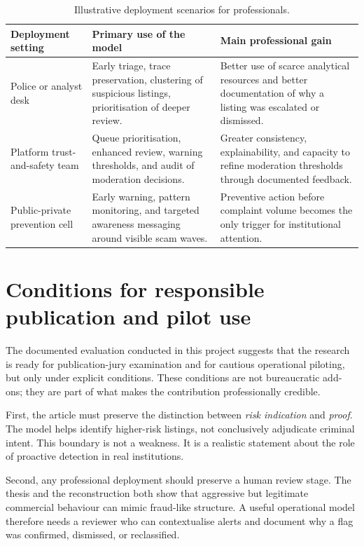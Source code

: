 \documentclass[11pt,a4paper]{article}
\begin{document}
\begin{table}[H]
\centering
\caption{Illustrative deployment scenarios for professionals.}
\begin{tabularx}{\textwidth}{p{3.2cm} Y Y}
\toprule
\textbf{Deployment setting} & \textbf{Primary use of the model} & \textbf{Main professional gain} \\
\midrule
Police or analyst desk & Early triage, trace preservation, clustering of suspicious listings, prioritisation of deeper review. & Better use of scarce analytical resources and better documentation of why a listing was escalated or dismissed. \\
Platform trust-and-safety team & Queue prioritisation, enhanced review, warning thresholds, and audit of moderation decisions. & Greater consistency, explainability, and capacity to refine moderation thresholds through documented feedback. \\
Public-private prevention cell & Early warning, pattern monitoring, and targeted awareness messaging around visible scam waves. & Preventive action before complaint volume becomes the only trigger for institutional attention. \\
\bottomrule
\end{tabularx}
\end{table}


\section{Conditions for responsible publication and pilot use}
The documented evaluation conducted in this project suggests that the research is ready for publication-jury examination and for cautious operational piloting, but only under explicit conditions. These conditions are not bureaucratic add-ons; they are part of what makes the contribution professionally credible.

First, the article must preserve the distinction between \emph{risk indication} and \emph{proof}. The model helps identify higher-risk listings, not conclusively adjudicate criminal intent. This boundary is not a weakness. It is a realistic statement about the role of proactive detection in real institutions.

Second, any professional deployment should preserve a human review stage. The thesis and the reconstruction both show that aggressive but legitimate commercial behaviour can mimic fraud-like structure. A useful operational model therefore needs a reviewer who can contextualise alerts and document why a flag was confirmed, dismissed, or reclassified.
\end{document}

